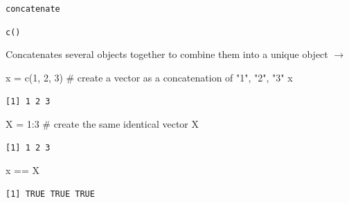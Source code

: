 \documentclass[
  ignorenonframetext,
]{beamer}
\newenvironment{Shaded}{\begin{snugshade}}{\end{snugshade}}
\newcommand{\CommentTok}[1]{\textcolor[rgb]{0.54,0.53,0.53}{#1}}
\newcommand{\DecValTok}[1]{\textcolor[rgb]{0.69,0.50,0.00}{#1}}
\newcommand{\FunctionTok}[1]{\textcolor[rgb]{0.39,0.29,0.61}{#1}}
\newcommand{\NormalTok}[1]{\textcolor[rgb]{0.12,0.11,0.11}{#1}}
\newcommand{\OtherTok}[1]{\textcolor[rgb]{0.00,0.43,0.16}{#1}}
\newcommand{\SpecialCharTok}[1]{\textcolor[rgb]{0.24,0.68,0.91}{#1}}
\begin{document}
\begin{frame}[fragile]{\texttt{concatenate}}
\protect\hypertarget{concatenate}{}
\begin{center}

\texttt{c()}

\end{center}

Concatenates several objects together to combine them into a unique
object \(\rightarrow\)

\small

\begin{Shaded}
\begin{Highlighting}[]
\NormalTok{x }\OtherTok{=} \FunctionTok{c}\NormalTok{(}\DecValTok{1}\NormalTok{, }\DecValTok{2}\NormalTok{, }\DecValTok{3}\NormalTok{) }\CommentTok{\# create a vector as a concatenation of "1", "2", "3"}
\NormalTok{x}
\end{Highlighting}
\end{Shaded}

\begin{verbatim}
[1] 1 2 3
\end{verbatim}

\begin{Shaded}
\begin{Highlighting}[]
\NormalTok{X }\OtherTok{=} \DecValTok{1}\SpecialCharTok{:}\DecValTok{3} \CommentTok{\# create the same identical vector}
\NormalTok{X}
\end{Highlighting}
\end{Shaded}

\begin{verbatim}
[1] 1 2 3
\end{verbatim}

\begin{Shaded}
\begin{Highlighting}[]
\NormalTok{x }\SpecialCharTok{==}\NormalTok{ X}
\end{Highlighting}
\end{Shaded}

\begin{verbatim}
[1] TRUE TRUE TRUE
\end{verbatim}
\end{frame}
\end{document}
